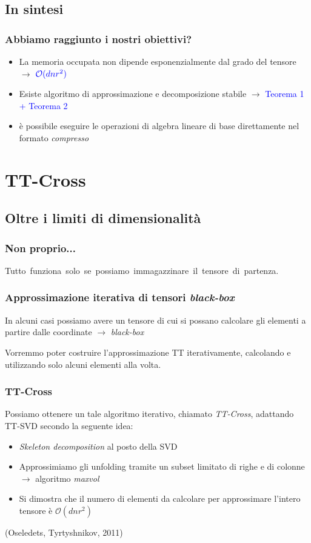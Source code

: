\documentclass[compress]{beamer}
\theoremstyle{definition}
\theoremstyle{plain}
\begin{document}
\subsection{In sintesi}
\begin{frame}
\frametitle{Abbiamo raggiunto i nostri obiettivi?}
\begin{itemize}
\item La memoria occupata non dipende esponenzialmente dal grado del tensore $\rightarrow$ {$\color{blue} \mathcal{O}(dnr^2)$} \color{black}
\item Esiste algoritmo di approssimazione e decomposizione stabile $\rightarrow$ \textcolor{blue}{Teorema 1 + Teorema 2}
\item è possibile eseguire le operazioni di algebra lineare di base direttamente nel formato \emph{compresso}
\end{itemize}
\end{frame}

\section{TT-Cross}
\subsection{Oltre i limiti di dimensionalità}
\begin{frame}
\frametitle{Non proprio...}
\pause
\alert{Tutto~funziona~solo~se~possiamo~immagazzinare~il~tensore~di~partenza.}
\end{frame}

\begin{frame}
\frametitle{Approssimazione iterativa di tensori \emph{black-box}}
In alcuni casi possiamo avere un tensore di cui si possano calcolare gli elementi a partire dalle coordinate $\rightarrow$ \emph{black-box}

\vspace{10mm}
Vorremmo poter costruire l'approssimazione TT iterativamente, calcolando e utilizzando solo alcuni elementi alla volta.
\end{frame}

\begin{frame}
\frametitle{TT-Cross}
Possiamo ottenere un tale algoritmo iterativo, chiamato \emph{TT-Cross}, adattando TT-SVD secondo la seguente idea:
\begin{itemize}
	\item \emph{Skeleton decomposition} al posto della SVD
	\item Approssimiamo gli unfolding tramite un subset limitato di righe e di colonne $\rightarrow$ algoritmo \emph{maxvol}
	\item Si dimostra che il numero di elementi da calcolare per approssimare l'intero tensore è $\mathcal{O}(dnr^2)$
\end{itemize}

\vspace{5mm}
(Oseledets, Tyrtyshnikov, 2011)
\end{frame}
\end{document}
